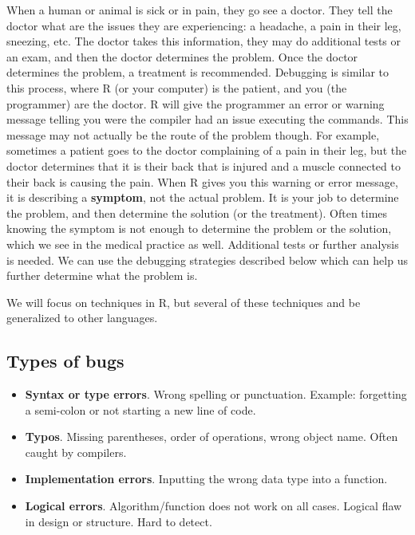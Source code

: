\documentclass[
]{book}
\begin{document}
When a human or animal is sick or in pain, they go see a doctor. They tell the doctor what are the issues they are experiencing: a headache, a pain in their leg, sneezing, etc. The doctor takes this information, they may do additional tests or an exam, and then the doctor determines the problem. Once the doctor determines the problem, a treatment is recommended. Debugging is similar to this process, where R (or your computer) is the patient, and you (the programmer) are the doctor. R will give the programmer an error or warning message telling you were the compiler had an issue executing the commands. This message may not actually be the route of the problem though. For example, sometimes a patient goes to the doctor complaining of a pain in their leg, but the doctor determines that it is their back that is injured and a muscle connected to their back is causing the pain. When R gives you this warning or error message, it is describing a \textbf{symptom}, not the actual problem. It is your job to determine the problem, and then determine the solution (or the treatment). Often times knowing the symptom is not enough to determine the problem or the solution, which we see in the medical practice as well. Additional tests or further analysis is needed. We can use the debugging strategies described below which can help us further determine what the problem is.

We will focus on techniques in R, but several of these techniques and be generalized to other languages.

\hypertarget{types-of-bugs}{%
\subsection*{Types of bugs}\label{types-of-bugs}}

\begin{itemize}
\item
  \textbf{Syntax or type errors}. Wrong spelling or punctuation. Example: forgetting a semi-colon or not starting a new line of code.
\item
  \textbf{Typos}. Missing parentheses, order of operations, wrong object name. Often caught by compilers.
\item
  \textbf{Implementation errors}. Inputting the wrong data type into a function.
\item
  \textbf{Logical errors}. Algorithm/function does not work on all cases. Logical flaw in design or structure. Hard to detect.
\end{itemize}
\end{document}

